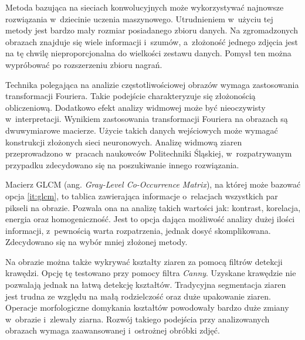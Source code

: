 Metoda bazująca na sieciach konwolucyjnych może wykorzystywać najnowsze
rozwiązania w~dziecinie uczenia maszynowego.
Utrudnieniem w~użyciu tej metody jest bardzo mały rozmiar posiadanego 
zbioru danych.
Na zgromadzonych obrazach znajduje się wiele informacji i~szumów,
a~złożoność jednego zdjęcia jest na tę chwilę nieproporcjonalna do wielkości
zestawu danych.
Pomysł ten można wypróbować po rozszerzeniu zbioru nagrań.

Technika polegająca na analizie częstotliwościowej obrazów wymaga zastosowania
transformacji Fouriera.
Takie podejście charakteryzuje się złożonością obliczeniową.
Dodatkowo efekt analizy widmowej może być nieoczywisty w~interpretacji.
Wynikiem zastosowania transformacji Fouriera na obrazach są dwuwymiarowe
macierze.
Użycie takich danych wejściowych może wymagać konstrukcji złożonych sieci
neuronowych.
Analizę widmową ziaren przeprowadzono w~pracach naukowców Politechniki
Śląskiej, w~rozpatrywanym przypadku zdecydowano się na poszukiwanie
innego rozwiązania.

Macierz GLCM (ang. \textit{Gray-Level Co-Occurrence Matrix}), na której może
bazować opcja \ref{it:glcm}, to tablica zawierająca informacje o~relacjach
wszystkich par pikseli na obrazie.
Pozwala ona na analizę takich wartości jak: kontrast, korelacja, energia
oraz homogeniczność.
Jest to opcja dająca możliwość analizy dużej ilości informacji, z~pewnością
warta rozpatrzenia, jednak dosyć skomplikowana.
Zdecydowano się na wybór mniej złożonej metody.

Na obrazie można także wykrywać kształty ziaren za pomocą filtrów detekcji
krawędzi.
Opcję tę testowano przy pomocy filtra \emph{Canny}.
Uzyskane krawędzie nie pozwalają jednak na łatwą detekcję kształtów.
Tradycyjna segmentacja ziaren jest trudna ze względu na małą rodzielczość
oraz duże upakowanie ziaren.
Operacje morfologiczne domykania kształtów powodowały bardzo duże zmiany
w~obrazie i~zlewały ziarna.
Rozwój takiego podejścia przy analizowanych obrazach wymaga zaawansowanej
i~ostrożnej obróbki zdjęć.

